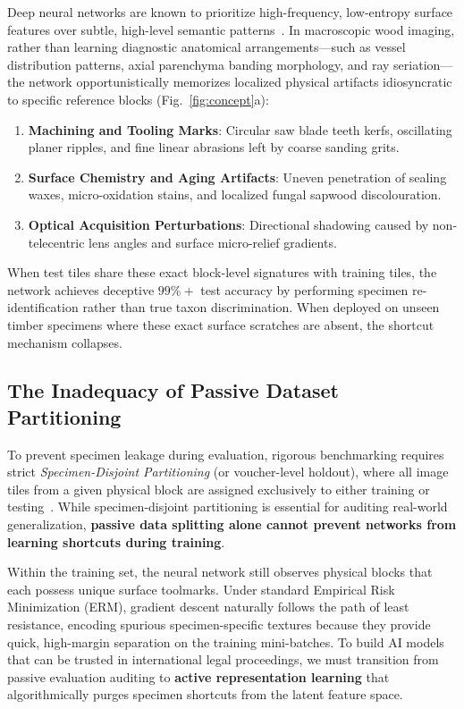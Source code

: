 \documentclass[a4paper,fleqn]{cas-sc}
\begin{document}
Deep neural networks are known to prioritize high-frequency, low-entropy surface features over subtle, high-level semantic patterns~\cite{geirhos2020,lapuschkin2019}. In macroscopic wood imaging, rather than learning diagnostic anatomical arrangements—such as vessel distribution patterns, axial parenchyma banding morphology, and ray seriation—the network opportunistically memorizes localized physical artifacts idiosyncratic to specific reference blocks (Fig.~\ref{fig:concept}a):
\begin{enumerate}
    \item \textbf{Machining and Tooling Marks}: Circular saw blade teeth kerfs, oscillating planer ripples, and fine linear abrasions left by coarse sanding grits.
    \item \textbf{Surface Chemistry and Aging Artifacts}: Uneven penetration of sealing waxes, micro-oxidation stains, and localized fungal sapwood discolouration.
    \item \textbf{Optical Acquisition Perturbations}: Directional shadowing caused by non-telecentric lens angles and surface micro-relief gradients.
\end{enumerate}
When test tiles share these exact block-level signatures with training tiles, the network achieves deceptive $99\%+$ test accuracy by performing specimen re-identification rather than true taxon discrimination. When deployed on unseen timber specimens where these exact surface scratches are absent, the shortcut mechanism collapses.

\subsection{The Inadequacy of Passive Dataset Partitioning}
To prevent specimen leakage during evaluation, rigorous benchmarking requires strict \textit{Specimen-Disjoint Partitioning} (or voucher-level holdout), where all image tiles from a given physical block are assigned exclusively to either training or testing~\cite{figueroamata2022}. While specimen-disjoint partitioning is essential for auditing real-world generalization, \textbf{passive data splitting alone cannot prevent networks from learning shortcuts during training}. 

Within the training set, the neural network still observes physical blocks that each possess unique surface toolmarks. Under standard Empirical Risk Minimization (ERM), gradient descent naturally follows the path of least resistance, encoding spurious specimen-specific textures because they provide quick, high-margin separation on the training mini-batches. To build AI models that can be trusted in international legal proceedings, we must transition from passive evaluation auditing to \textbf{active representation learning} that algorithmically purges specimen shortcuts from the latent feature space.
\end{document}
